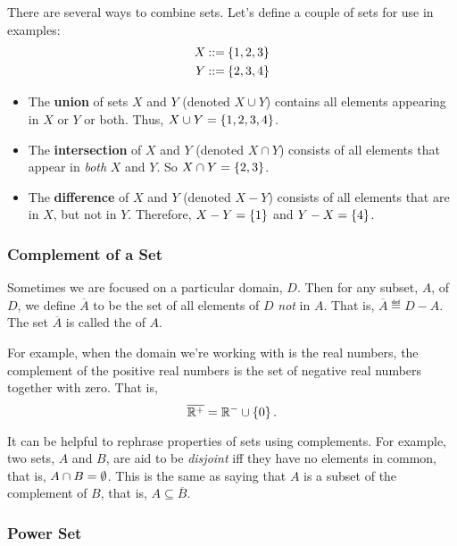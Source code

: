 There are several ways to combine sets.  Let's define a couple of sets for
use in examples:
%
\begin{align*}
X & \mathbin{::=} \left\{1, 2, 3\right\} \\
Y & \mathbin{::=} \left\{2, 3, 4\right\}
\end{align*}
%
\begin{itemize}

\item The \textbf{union} of sets $X$ and $Y$ (denoted $X \cup Y$)
contains all elements appearing in $X$ or $Y$ or both.  Thus, $X \cup
Y = \left\{1, 2, 3, 4\right\}$.

\item The \textbf{intersection} of $X$ and $Y$ (denoted $X \cap Y$)
consists of all elements that appear in \textit{both} $X$ and $Y$.  So
$X \cap Y = \left\{2, 3\right\}$.

\item The \textbf{difference} of $X$ and $Y$ (denoted $X - Y$)
consists of all elements that are in $X$, but not in $Y$.  Therefore,
$X - Y = \left\{1\right\}$ and $Y - X = \left\{4\right\}$.

\end{itemize}

\subsubsection{Complement of a Set}

Sometimes we are focused on a particular domain, $D$.  Then for any
subset, $A$, of $D$, we define $\overline{A}$ to be the set of all
elements of $D$ \textit{not} in $A$.  That is, $\overline{A} \eqdef D-A$.
The set $\overline{A}$ is called the  of $A$.

For example, when the domain we're working with is the real numbers,
the complement of the positive real numbers is the set of negative real
numbers together with zero.  That is,
\[
\overline{\mathbb{R}^+} = \mathbb{R}^- \cup \left\{0\right\}.
\]

It can be helpful to rephrase properties of sets using complements.  For
example, two sets, $A$ and $B$, are aid to be \emph{disjoint} iff they
have no elements in common, that is, $A \cap B = \emptyset$.  This
is the same as saying that $A$ is a subset of the complement of $B$, that
is, $A \subseteq \overline{B}$.

\subsubsection{Power Set}

